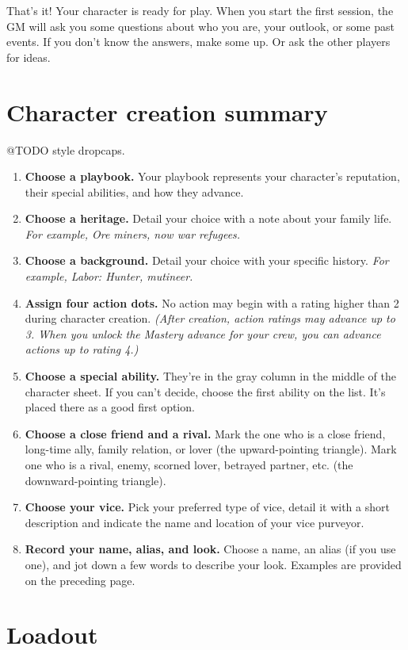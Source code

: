 \documentclass[11pt,oneside]{book}
\begin{document}
That’s it! Your character is ready for play. When you start the first session, the GM will ask you some questions about who you are, your outlook, or some past events. If you don’t know the answers, make some up. Or ask the other players for ideas.

\section{Character creation summary}

@TODO style dropcaps.

\begin{enumerate}
	\item \textbf{Choose a playbook.} Your playbook represents your character’s reputation, their special abilities, and how they advance.
	\item \textbf{Choose a heritage.} Detail your choice with a note about your family life. \emph{For example, Ore miners, now war refugees.}
	\item \textbf{Choose a background.} Detail your choice with your specific history. \emph{For example, Labor: Hunter, mutineer.}
	\item \textbf{Assign four action dots.} No action may begin with a rating higher than 2 during character creation. \emph{(After creation, action ratings may advance up to 3. When you unlock the Mastery advance for your crew, you can advance actions up to rating 4.)}
	\item \textbf{Choose a special ability.} They’re in the gray column in the middle of the character sheet. If you can’t decide, choose the first ability on the list. It’s placed there as a good first option.
	\item \textbf{Choose a close friend and a rival.} Mark the one who is a close friend, long-time ally, family relation, or lover (the upward-pointing triangle). Mark one who is a rival, enemy, scorned lover, betrayed partner, etc. (the downward-pointing triangle).
	\item \textbf{Choose your vice.} Pick your preferred type of vice, detail it with a short description and indicate the name and location of your vice purveyor.
	\item \textbf{Record your name, alias, and look.} Choose a name, an alias (if you use one), and jot down a few words to describe your look. Examples are provided on the preceding page.
\end{enumerate}

\section{Loadout}
\end{document}
